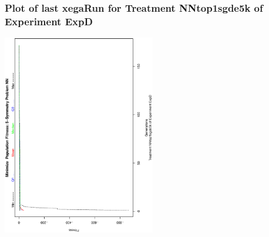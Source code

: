 \begin{frame}
 \frametitle{ Plot of last xegaRun for Treatment NNtop1sgde5k of Experiment ExpD }
 \begin{center}
\includegraphics[width=0.5\textwidth, angle=-90]
{ExpDPlotPopStatsFigure008.eps}
 \end{center}
 \label{report/ExpDPlotPopStatsFigure008.eps}  
 \end{frame}

